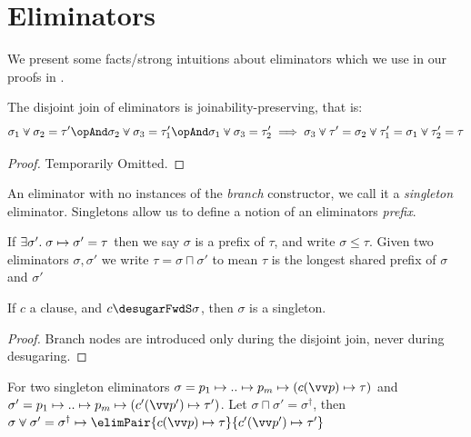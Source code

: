 \section{Eliminators}
We present some facts/strong intuitions about eliminators which we use in our proofs in .



\begin{theorem}
   \label{thm:join-preserves-join}
   The disjoint join of eliminators is joinability-preserving, that is:
   $$
      \sigma_1 \disjjoin \sigma_2 = \tau' \opAnd \sigma_2 \disjjoin \sigma_3 = \tau'_1 \opAnd \sigma_1 \disjjoin \sigma_3 = \tau'_2
      \newline
      \implies \sigma_3 \disjjoin \tau' = \sigma_2 \disjjoin \tau'_1 = \sigma_1 \disjjoin \tau'_2 = \tau
   $$
\end{theorem}
\begin{proof}
   Temporarily Omitted.
\end{proof}

An eliminator with no instances of the \textit{branch} constructor, we call it a \textit{singleton} eliminator.
Singletons allow us to define a notion of an eliminators \textit{prefix}.

\begin{definition}
   If $\exists \sigma'.\; \sigma \mapsto \sigma' = \tau$ then we say $\sigma$ is a prefix of $\tau$,
   and write $\sigma \leq \tau$. Given two eliminators $\sigma,\sigma'$ we write $\tau = \sigma \sqcap \sigma'$
   to mean $\tau$ is the longest shared prefix of $\sigma$ and $\sigma'$
\end{definition}
\begin{lemma}
   If $c$ a clause, and $c \desugarFwdS \sigma$, then $\sigma$ is a singleton.
\end{lemma}
\begin{proof}
   Branch nodes are introduced only during the disjoint join, never during desugaring.
\end{proof}
\begin{lemma}
   For two singleton eliminators $\sigma = \seqRangeOp{p_1}{p_m}{\elimmapsto} \elimmapsto (\exConstr{c}{\seq{p}} \elimmapsto \tau)$ and
   $\sigma' = \seqRangeOp{p_1}{p_m}{\elimmapsto} \elimmapsto (\exConstr{c'}{\seq{p}'} \elimmapsto \tau')$.
   Let $\sigma \sqcap \sigma' = \sigma^{\dag}$, then
   $\sigma \disjjoin \sigma' = \sigma^{\dag} \elimmapsto \elimPair{\exConstr{c}{\seq{p}} \elimmapsto \tau}{\exConstr{c'}{\seq{p}'} \elimmapsto \tau'}$
\end{lemma}
